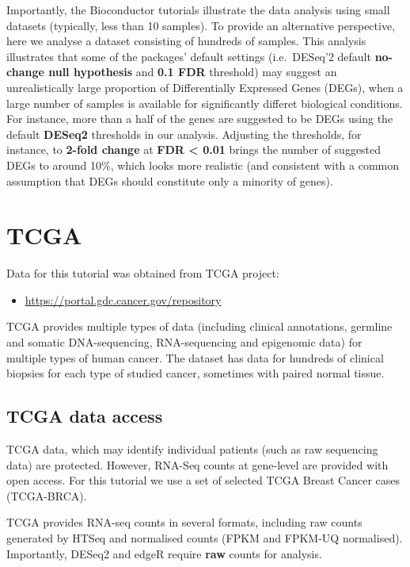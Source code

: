 \documentclass[]{book}
\providecommand{\tightlist}{%
  \setlength{\itemsep}{0pt}\setlength{\parskip}{0pt}}
\begin{document}
Importantly, the Bioconductor tutorials illustrate the data analysis
using small datasets (typically, less than 10 samples). To provide an
alternative perspective, here we analyse a dataset consisting of
hundreds of samples. This analysis illustrates that some of the
packages' default settings (i.e.~DESeq'2 default \textbf{no-change null
hypothesis} and \textbf{0.1 FDR} threshold) may suggest an
unrealistically large proportion of Differentially Expressed Genes
(DEGs), when a large number of samples is available for significantly
differet biological conditions. For instance, more than a half of the
genes are suggested to be DEGs using the default \textbf{DESeq2}
thresholds in our analysis. Adjusting the thresholds, for instance, to
\textbf{2-fold change} at \textbf{FDR \textless{} 0.01} brings the
number of suggested DEGs to around 10\%, which looks more realistic (and
consistent with a common assumption that DEGs should constitute only a
minority of genes).

\section{TCGA}\label{tcga}

Data for this tutorial was obtained from TCGA project:

\begin{itemize}
\tightlist
\item
  \url{https://portal.gdc.cancer.gov/repository}
\end{itemize}

TCGA provides multiple types of data (including clinical annotations,
germline and somatic DNA-sequencing, RNA-sequencing and epigenomic data)
for multiple types of human cancer. The dataset has data for hundreds of
clinical biopsies for each type of studied cancer, sometimes with paired
normal tissue.

\subsection{TCGA data access}\label{tcga-data-access}

TCGA data, which may identify individual patients (such as raw
sequencing data) are protected. However, RNA-Seq counts at gene-level
are provided with open access. For this tutorial we use a set of
selected TCGA Breast Cancer cases (TCGA-BRCA).

TCGA provides RNA-seq counts in several formats, including raw counts
generated by HTSeq and normalised counts (FPKM and FPKM-UQ normalised).
Importantly, DESeq2 and edgeR require \textbf{raw} counts for analysis.
\end{document}
